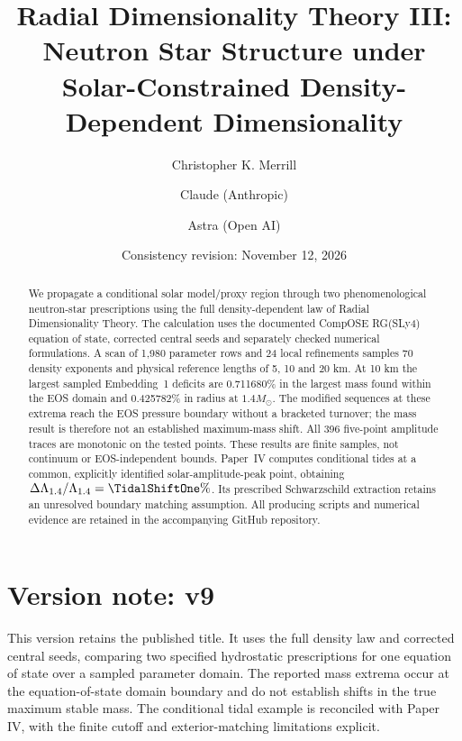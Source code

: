\documentclass[twocolumn,prd,superscriptaddress,nofootinbib]{revtex4-2}
\begin{document}
\raggedbottom

\title{Radial Dimensionality Theory III: Neutron Star Structure under Solar-Constrained Density-Dependent Dimensionality}
\author{Christopher K. Merrill}

\author{Claude (Anthropic)}

\author{Astra (Open AI)}

\date{Consistency revision: November 12, 2026}

\begin{abstract}
We propagate a conditional solar model/proxy region through two
phenomenological neutron-star prescriptions using the full density-dependent
law of Radial Dimensionality Theory. The calculation uses the documented
CompOSE RG(SLy4) equation of state, corrected central seeds and separately
checked numerical formulations. A scan of 1,980 parameter rows and 24 local
refinements samples 70 density exponents and physical reference lengths of
5, 10 and 20 km. At 10 km the largest sampled Embedding~1 deficits are
0.711680\% in the largest mass found within the EOS domain and 0.425782\%
in radius at $1.4M_\odot$. The modified sequences at these extrema reach
the EOS pressure boundary without a bracketed turnover; the mass result
is therefore not an established maximum-mass shift. All 396 five-point
amplitude traces are monotonic on the tested points. These results are
finite samples, not continuum or EOS-independent bounds. Paper~IV computes
conditional tides at a common, explicitly identified solar-amplitude-peak
point, obtaining $\Delta\Lambda_{1.4}/\Lambda_{1.4}=\TidalShiftOne\%$.
Its prescribed Schwarzschild extraction retains an unresolved boundary
matching assumption. All producing scripts and numerical evidence are
retained in the accompanying GitHub repository.
\end{abstract}
\maketitle

\section*{Version note: v9}
This version retains the published title. It uses the full density law and corrected central seeds, comparing two specified hydrostatic prescriptions for one equation of state over a sampled parameter domain. The reported mass extrema occur at the equation-of-state domain boundary and do not establish shifts in the true maximum stable mass. The conditional tidal example is reconciled with Paper IV, with the finite cutoff and exterior-matching limitations explicit.
\end{document}
